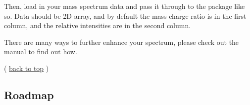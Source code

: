 Then, load in your mass spectrum data and pass it through to the package
like so. Data should be 2D array, and by default the mass-charge ratio
is in the first column, and the relative intensities are in the second
column.

\begin{Shaded}
\begin{Highlighting}[]

\NormalTok{)) }

\end{Highlighting}
\end{Shaded}


There are many ways to further enhance your spectrum, please check out
the manual to find out how.

(
\href{https://github.com/typst/packages/raw/main/packages/preview/ionio-illustrate/0.2.0/\#readme-top}{back
to top} )

\subsection{Roadmap}\label{roadmap}

